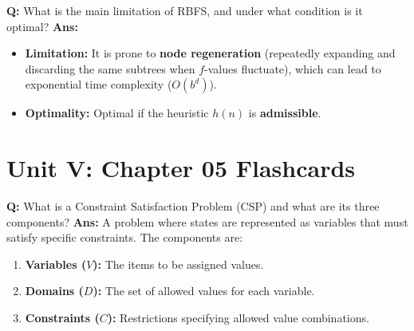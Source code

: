 \documentclass[10pt,a4paper,twocolumn]{article}
\begin{document}
\begin{tcolorbox}[
  colback=white,
  colframe=UnitColorFour,
  colbacktitle=gray!10!white,
  coltitle=black,
  fonttitle=\bfseries\sffamily\small,
  title={Unit IV $\bullet$ Card 14: RBFS Time Complexity \& Optimality (Q4.7)},
  boxrule=1.2pt,
  arc=2mm,
  outer arc=2mm,
  boxsep=1.5mm,
  top=1mm,
  bottom=1mm,
  left=1.5mm,
  right=1.5mm,
  before skip=2.5mm,
  after skip=2.5mm
]
\textbf{Q:} What is the main limitation of RBFS, and under what condition is it optimal?
\tcbline
\textbf{Ans:} \begin{itemize}
  \item   \textbf{Limitation:} It is prone to \textbf{node regeneration} (repeatedly expanding and discarding the same subtrees when $f$-values fluctuate), which can lead to exponential time complexity ($O(b^d)$).
  \item   \textbf{Optimality:} Optimal if the heuristic $h(n)$ is \textbf{admissible}.
\end{itemize}
\end{tcolorbox}

\section*{Unit V: Chapter 05 Flashcards}

\begin{tcolorbox}[
  colback=white,
  colframe=UnitColorFive,
  colbacktitle=gray!10!white,
  coltitle=black,
  fonttitle=\bfseries\sffamily\small,
  title={Unit V $\bullet$ Card 1: Definition of CSP},
  boxrule=1.2pt,
  arc=2mm,
  outer arc=2mm,
  boxsep=1.5mm,
  top=1mm,
  bottom=1mm,
  left=1.5mm,
  right=1.5mm,
  before skip=2.5mm,
  after skip=2.5mm
]
\textbf{Q:} What is a Constraint Satisfaction Problem (CSP) and what are its three components?
\tcbline
\textbf{Ans:} A problem where states are represented as variables that must satisfy specific constraints. The components are:
\begin{enumerate}
  \item \textbf{Variables ($V$):} The items to be assigned values.
  \item \textbf{Domains ($D$):} The set of allowed values for each variable.
  \item \textbf{Constraints ($C$):} Restrictions specifying allowed value combinations.
\end{enumerate}
\end{tcolorbox}
\end{document}
